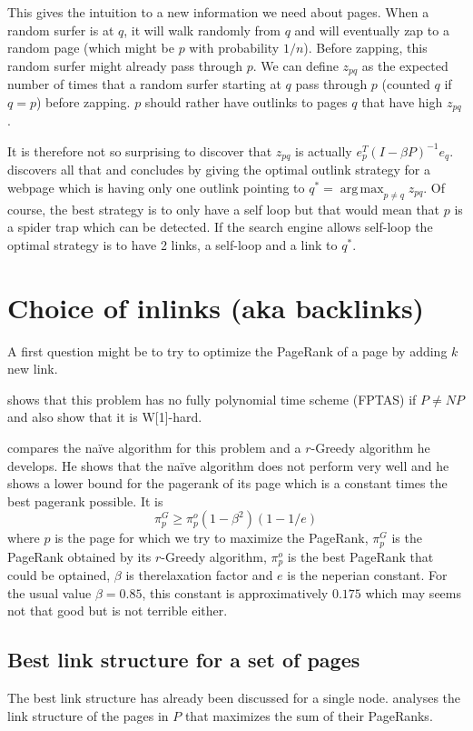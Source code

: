 \documentclass{article}
\DeclareMathOperator*{\argmax}{arg\,max}
\newcommand{\1}{\mathbf{1}}
\theoremstyle{definition}
\begin{document}
This gives the intuition to a new information we need about pages.
When a random surfer is at $q$, it will walk randomly from $q$ and will eventually zap to a random page (which might be $p$ with probability $1/n$).
Before zapping, this random surfer might already pass through $p$.
We can define $z_{pq}$ as the expected number of times that a random surfer starting at $q$ pass through $p$ (counted $q$ if $q=p$) before zapping.
$p$ should rather have outlinks to pages $q$ that have high $z_{pq}$.

It is therefore not so surprising to discover that $z_{pq}$ is actually $e_p^T(I-\beta P)^{-1}e_q$.
\cite{avrachenkov2006effect} discovers all that and concludes by giving the optimal outlink strategy for a webpage which is having only one outlink pointing to $q^* = \argmax_{p \neq q} z_{pq}$.
Of course, the best strategy is to only have a self loop but that would mean that $p$ is a spider trap which can be detected.
If the search engine allows self-loop the optimal strategy is to have 2 links, a self-loop and a link to $q^*$.

\section{Choice of inlinks (aka backlinks)}
A first question might be to try to optimize the PageRank of a page
by adding $k$ new link.

\cite{olsen2010maximizing} shows that this problem has no fully polynomial time scheme (FPTAS) if $P \neq NP$ and also show that it is W[1]-hard.

\cite{olsen2010constant} compares the naïve algorithm for this problem and a $r$-Greedy algorithm he develops.
He shows that the naïve algorithm does not perform very well and he shows a lower bound for the pagerank of its page which is a constant times the best pagerank possible. It is
\[ \pi_p^G \geq \pi_p^o(1 - \beta^2)(1 - 1/e) \]
where $p$ is the page for which we try to maximize the PageRank,
$\pi_p^G$ is the PageRank obtained by its $r$-Greedy algorithm, $\pi_p^o$ is the best PageRank that could be optained, $\beta$ is therelaxation factor and $e$ is the neperian constant.
For the usual value $\beta = 0.85$, this constant is approximatively $0.175$ which may seems not that good but is not terrible either.

\subsection{Best link structure for a set of pages}
The best link structure has already been discussed for a single node.
\cite{de2008maximizing} analyses the link structure of the pages in $P$ that maximizes the sum of their PageRanks.
\end{document}
